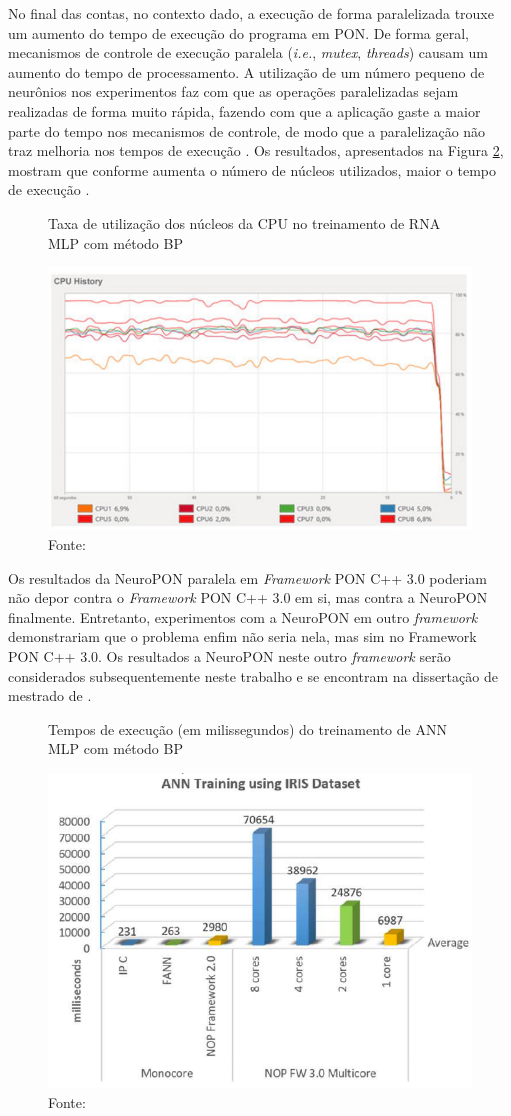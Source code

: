 No final das contas, no contexto dado, a execução de forma paralelizada trouxe
um aumento do tempo de execução do programa em PON. De forma geral, mecanismos
de controle de execução paralela (\textit{i.e.}, \textit{mutex},
\textit{threads}) causam um aumento do tempo de processamento. A utilização de
um número pequeno de neurônios nos experimentos faz com que as operações
paralelizadas sejam realizadas de forma muito rápida, fazendo com que a
aplicação gaste a maior parte do tempo nos mecanismos de controle, de modo que a
paralelização não traz melhoria nos tempos de execução \cite{schutz_2018}. Os
resultados, apresentados na Figura \ref{fig:pon_multi}, mostram que conforme
aumenta o número de núcleos utilizados, maior o tempo de execução
\cite{schutz_2018}.

\begin{figure}[!htb]
  \centering
  \caption{Taxa de utilização dos núcleos da CPU no treinamento de RNA MLP com método BP}
  \includegraphics[width=.65\textwidth]{../figures/core_usage_cpp3.png}
  \caption*{Fonte: }
  \label{fig:core_usage_cpp3}
\end{figure}

Os resultados da NeuroPON paralela em \textit{Framework} PON C++ 3.0 poderiam
não depor contra o \textit{Framework} PON C++ 3.0 em si, mas contra a NeuroPON
finalmente. Entretanto, experimentos com a NeuroPON em outro \textit{framework}
demonstrariam que o problema enfim não seria nela, mas sim no Framework PON C++
3.0. Os resultados a NeuroPON neste outro \textit{framework} serão considerados
subsequentemente neste trabalho e se encontram na dissertação de mestrado de
.

\begin{figure}[!htb]
  \centering
  \caption{Tempos de execução (em milissegundos) do treinamento de ANN MLP com método BP}
  \includegraphics[width=.55\textwidth]{../figures/pon_multi_fix.png}
  \caption*{Fonte: }
  \label{fig:pon_multi}
\end{figure}


